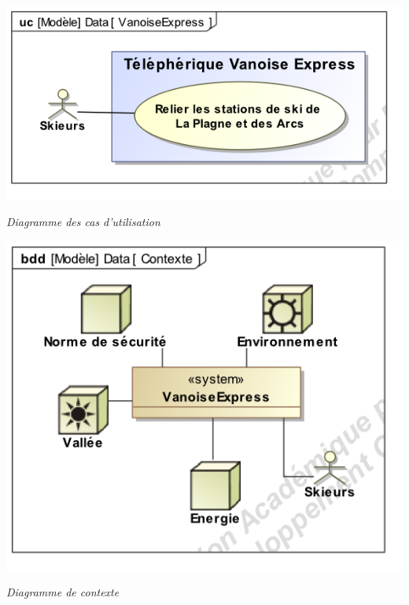 \documentclass[10pt]{article}
\begin{document}
\begin{minipage}[c]{.15\linewidth}
\begin{center}
\includegraphics[width=\textwidth]{images/uc}

\textit{Diagramme des cas d'utilisation}
\end{center}
\end{minipage} \hfill
\begin{minipage}[c]{.15\linewidth}
\begin{center}
\includegraphics[width=\textwidth]{images/contexte}

\textit{Diagramme de contexte}
\end{center}
\end{minipage} \hfill
\end{document}
